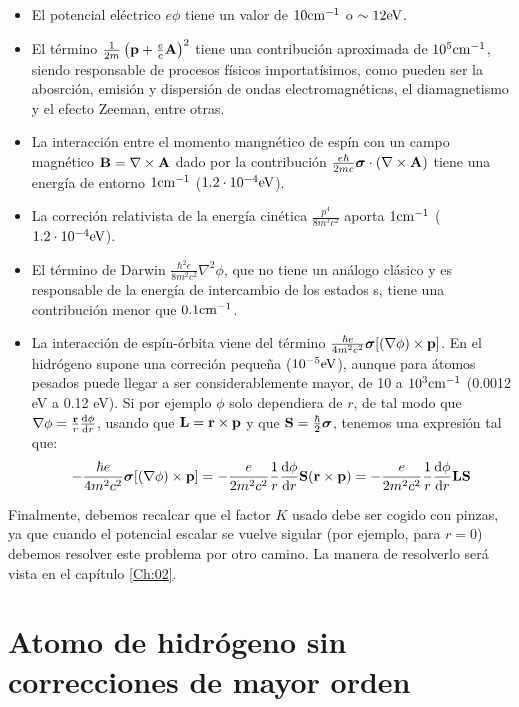 \begin{itemize}
\item El potencial eléctrico $e\phi$ tiene un valor de $10\text{cm}^{-1}$ o $\sim 12 \text{eV}$.
\item El término $ \frac{1}{2m} \left( \mathbf{p}+\frac{e}{c}\mathbf{A} \right)^2$ tiene una contribución aproximada de $10^5 \text{cm}^{-1}$, siendo responsable de procesos físicos importatísimos, como pueden ser la abosrción, emisión y dispersión de ondas electromagnéticas, el diamagnetismo y el efecto Zeeman, entre otras.
\item La interacción entre el momento mangnético de espín con un campo magnético $\mathbf{B} = \nabla \times \mathbf{A}$ dado por la contribución $\frac{e\hbar}{2mc} \boldsymbol{\sigma} \cdot (\nabla \times \mathbf{A}) $ tiene una energía de entorno $1\text{cm}^{-1}$ ($1.2 \cdot 10^{-4} \text{eV}$). 
\item La correción relativista de la energía cinética $\frac{p^4}{8 m^3 c^2} $ aporta $1\text{cm}^{-1}$ ($1.2 \cdot 10^{-4} \text{eV}$).
\item El término de Darwin $\frac{\hbar^2 e}{8 m^2 c^2} \nabla^2 \phi$, que no tiene un análogo clásico y es responsable de la energía de intercambio de los estados s, tiene una contribución menor que $0.1\text{cm}^{-1}$.
\item La interacción de espín-órbita viene del término $\frac{ \hbar e}{4m^2 c^2} \boldsymbol{\sigma} [(\nabla \phi)\times \mathbf{p}]$. En el hidrógeno supone una correción pequeña ($10^{-5} \text{eV}$), aunque para átomos pesados puede llegar a ser considerablemente mayor, de 10 a $10^3 \text{cm}^{-1}$ (0.0012 eV a 0.12 eV). Si por ejemplo $\phi$ solo dependiera de $r$, de tal modo que $\nabla \phi = \frac{\mathbf{r}}{r} \frac{\mathrm{d} \phi}{\mathrm{d} r}$, usando que $\mathbf{L} = \mathbf{r} \times \mathbf{p}$ y que $\mathbf{S} = \frac{\hbar}{2} \boldsymbol{\sigma}$, tenemos una expresión tal que:
\begin{equation}
    -\frac{ \hbar e}{4m^2 c^2} \boldsymbol{\sigma} [(\nabla \phi)\times \mathbf{p}] = - \frac{e}{2m^2 c^2} \frac{1}{r} \frac{\mathrm{d} \phi}{\mathrm{d} r}  \mathbf{S} (\mathbf{r} \times \mathbf{p}) = - \frac{e}{2m^2 c^2} \frac{1}{r} \frac{\mathrm{d} \phi}{\mathrm{d} r} \mathbf{L} \mathbf{S}
\end{equation}
\end{itemize}
Finalmente, debemos recalcar que el factor $K$ usado debe ser cogido con pinzas, ya que cuando el potencial escalar se vuelve sigular (por ejemplo, para $r=0$) debemos resolver este problema por otro camino. La manera de resolverlo será vista en el capítulo \ref{Ch:02}.

\section{Atomo de hidrógeno sin correcciones de mayor orden}

